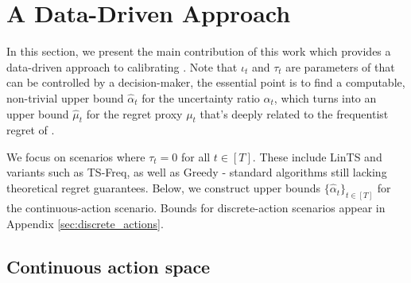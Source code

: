 \section{A Data-Driven Approach}\label{sec:data-driven}






In this section, we present the main contribution of this work which provides a data-driven approach to calibrating \POFUL{}. Note that $\iota_t$ and $\tau_t$ are parameters of \POFUL{} that can be controlled by a decision-maker, the essential point is to find a computable, non-trivial upper bound $\hat{\alpha}_t$ for the uncertainty ratio $\alpha_t$, which turns into an upper bound $\hat{\mu}_t$ for the regret proxy $\mu_t$ that's deeply related to the frequentist regret of \POFUL{}. 





We focus on scenarios where $\tau_t = 0$ for all $t\in [T]$. These include LinTS and variants such as TS-Freq, as well as Greedy - standard algorithms still lacking theoretical regret guarantees. Below, we construct upper bounds $\{\hat{\alpha}_t\}_{t\in[T]}$ for the continuous-action scenario. Bounds for discrete-action scenarios appear in Appendix \ref{sec:discrete_actions}.
 
 
 
 















\subsection{Continuous action space}
\label{sec:bound_sst_ratio}  

